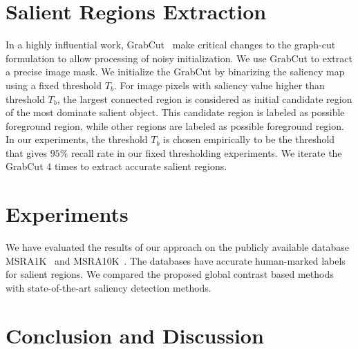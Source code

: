 \documentclass{article}
\begin{document}
\section{Salient Regions Extraction}
In a highly influential work, GrabCut~\cite{rother2004grabcut} make critical changes to the graph-cut formulation to allow processing of noisy initialization. We use GrabCut to extract a precise image mask. We initialize the GrabCut by binarizing the saliency map using a fixed threshold $T_b$. For image pixels with saliency value higher than threshold $T_b$, the largest connected region is considered as initial candidate region of the most dominate salient object. This candidate region is labeled as possible foreground region, while other regions are labeled as possible foreground region. In our experiments, the threshold $T_b$ is chosen empirically to be the threshold that gives $95\%$ recall rate in our fixed thresholding experiments. We iterate the GrabCut $4$ times to extract accurate salient regions.

\section{Experiments}
We have evaluated the results of our approach on the publicly available database MSRA1K~\cite{achanta2009frequency} and MSRA10K~\cite{cheng2015global}. The databases have accurate human-marked labels for salient regions. We compared the proposed global contrast based methods with state-of-the-art saliency detection methods.
\section{Conclusion and Discussion}



\end{document}
